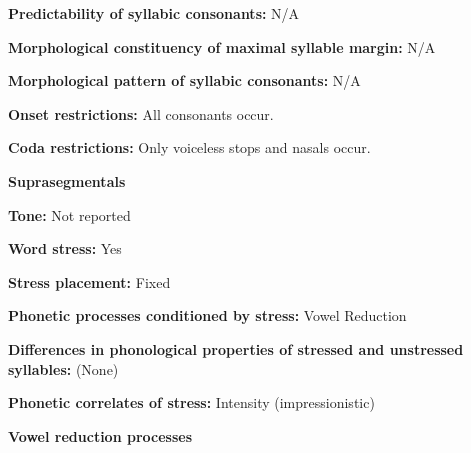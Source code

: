 \begin{styleBody}
\textbf{Predictability of syllabic consonants:} N/A
\end{styleBody}

\begin{styleBody}
\textbf{Morphological constituency of maximal syllable margin:} N/A
\end{styleBody}

\begin{styleBody}
\textbf{Morphological pattern of syllabic consonants:} N/A
\end{styleBody}

\begin{styleBody}
\textbf{Onset restrictions: }All consonants occur.
\end{styleBody}

\begin{styleBody}
\textbf{Coda restrictions:} Only voiceless stops and nasals occur.
\end{styleBody}

\begin{styleBody}
\textbf{Suprasegmentals}
\end{styleBody}

\begin{styleBody}
\textbf{Tone:} Not reported
\end{styleBody}

\begin{styleBody}
\textbf{Word stress:} Yes
\end{styleBody}

\begin{styleBody}
\textbf{Stress placement:} Fixed
\end{styleBody}

\begin{styleBody}
\textbf{Phonetic processes conditioned by stress:} Vowel Reduction
\end{styleBody}

\begin{styleBody}
\textbf{Differences in phonological properties of stressed and unstressed syllables:} (None)
\end{styleBody}

\begin{styleBody}
\textbf{Phonetic correlates of stress: }Intensity (impressionistic)
\end{styleBody}

\begin{styleBody}
\textbf{Vowel reduction processes}
\end{styleBody}

